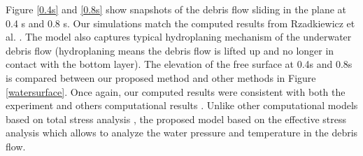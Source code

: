 \documentclass[preprint,12pt]{elsarticle}
\begin{document}
%
%
Figure \ref{0.4s} and  \ref{0.8s} show snapshots of the debris flow sliding in the plane at 0.4 s and 0.8 s. Our simulations match the computed results from Rzadkiewicz et al. \cite{Rzadkiewicz}. The model also captures typical hydroplaning mechanism of the underwater debris flow (hydroplaning means the debris flow is lifted up and no longer in contact with the bottom layer). The elevation of the free surface at 0.4s and 0.8s is compared between our proposed method and other methods in Figure \ref{watersurface}. Once again, our computed results were consistent with both the experiment and others computational results \cite{Zhang2019}. Unlike other computational models based on total stress analysis  \cite{Tran2019, Capone2010,Zhang2019, Dey2016}, the proposed model based on the effective stress analysis which allows to analyze the water pressure  and temperature in the debris flow.\\
%
%
\end{document}
